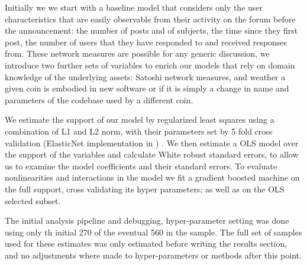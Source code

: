 Initially we we start with a baseline model that considers only the user characteristics that are easily observable from their activity on the forum before the announcement: the number of posts and of subjects,  the time since they first post, the number of users that they have responded to and received responses from. 
These network measures are possible for any generic discussion, we introduce two further sets of variables to enrich our models that rely on domain knowledge of the underlying assets: Satoshi network measures, and weather a given coin is embodied in new software or if it is simply a change in name and parameters of the codebase used by a different coin.

We estimate the support of our model by regularized least squares using a combination of L1 and L2 norm, with their parameters set by 5 fold cross validation  (ElasticNet implementation in \cite{scikit-learn}) . 
We then estimate a OLS model over the support of the variables and calculate White robust standard errors, to allow us to examine the model coefficients and their standard errors. 
To evaluate nonlinearities and interactions  in the model we fit a gradient boosted machine on the full support, cross validating its hyper parameters; as well as on the OLS selected subset. 

The initial analysis pipeline and debugging, hyper-parameter setting was done using only th initial 270 of the eventual 560 in the sample.
The full set of samples used for these estimates was only estimated before writing the results section, and no adjustments where made to hyper-parameters or methods after this point.
